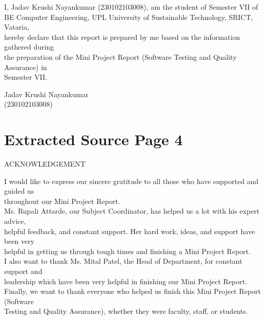 \documentclass[12pt,a4paper]{report}
\begin{document}
\smallskip
I, Jadav Krushi Nayankumar (230102103008), am the student of Semester VII of\\ 
BE Computer Engineering, UPL University of Sustainable Technology, SRICT, Vataria,\\ 
hereby declare that this report is prepared by me based on the information gathered during\\ 
the preparation of the Mini Project Report (Software Testing and Quality Assurance) in\\ 
Semester VII.\\ 

\smallskip

\smallskip

\smallskip

\smallskip
Jadav Krushi Nayankumar\\ 

\smallskip
(230102103008)\\ 

\clearpage
\section*{Extracted Source Page 4}
ACKNOWLEDGEMENT\\ 

\smallskip

\smallskip

\smallskip
I would like to express our sincere gratitude to all those who have supported and guided us\\ 
throughout our Mini Project Report.\\ 

\smallskip
Ms. Rupali Attarde, our Subject Coordinator, has helped us a lot with his expert advice,\\ 
helpful feedback, and constant support. Her hard work, ideas, and support have been very\\ 
helpful in getting us through tough times and finishing a Mini Project Report.\\ 

\smallskip
I also want to thank Ms. Mital Patel, the Head of Department, for constant support and\\ 
leadership which have been very helpful in finishing our Mini Project Report.\\ 

\smallskip
Finally, we want to thank everyone who helped us finish this Mini Project Report (Software\\ 
Testing and Quality Assurance), whether they were faculty, staff, or students.\\ 
\end{document}
